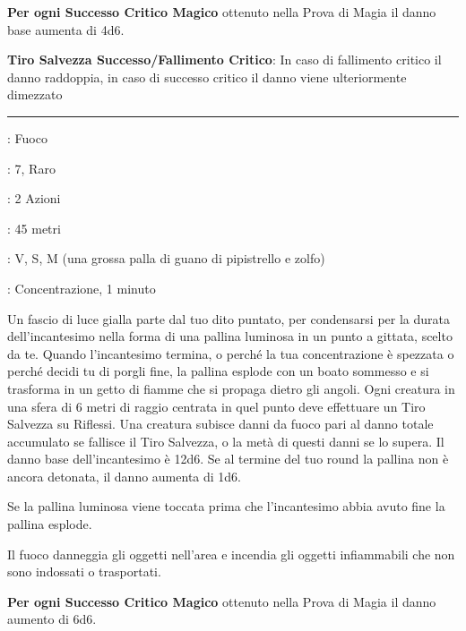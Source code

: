 \begin{multicols}{2}
\textbf{Per ogni Successo Critico Magico} ottenuto nella Prova di Magia il danno base aumenta di 4d6.

\textbf{Tiro Salvezza Successo/Fallimento Critico}: In caso di fallimento critico il danno raddoppia, in caso di successo critico il danno viene ulteriormente dimezzato

\smallskip\noindent\rule{\linewidth}{2pt} \hypertarget{Palla di Fuoco Ritardata}{}\medskip{}
\noindent
\begin{description}[noitemsep, topsep=0pt, parsep=0pt, partopsep=0pt, leftmargin=0cm, labelwidth=2.8cm]
	\item[\textbf{Lista di Magia}]: Fuoco
	\item[\textbf{Livello}]: 7, Raro
	\item[\textbf{T. di Lancio}]: 2 Azioni
	\item[\textbf{Gittata}]: 45 metri
	\item[\textbf{Componenti}]: V, S, M (una grossa palla di guano di pipistrello e zolfo)
	\item[\textbf{Durata}]: Concentrazione, 1 minuto
\end{description}

Un fascio di luce gialla parte dal tuo dito puntato, per condensarsi per la durata dell'incantesimo nella forma di una pallina luminosa in un punto a gittata, scelto da te. Quando l'incantesimo termina, o perché la tua concentrazione è spezzata o perché decidi tu di porgli fine, la pallina esplode con un boato sommesso e si trasforma in un getto di fiamme che si propaga dietro gli angoli. Ogni creatura in una sfera di 6 metri di raggio centrata in quel punto deve effettuare un Tiro Salvezza su Riflessi. Una creatura subisce danni da fuoco pari al danno totale accumulato se fallisce il Tiro Salvezza, o la metà di questi danni se lo supera. Il danno base dell'incantesimo è 12d6. Se al termine del tuo round la pallina non è ancora detonata, il danno aumenta di 1d6.

Se la pallina luminosa viene toccata prima che l'incantesimo abbia avuto fine la pallina esplode.

Il fuoco danneggia gli oggetti nell'area e incendia gli oggetti infiammabili che non sono indossati o trasportati.

\textbf{Per ogni Successo Critico Magico} ottenuto nella Prova di Magia il danno aumento di 6d6.


\end{multicols}
